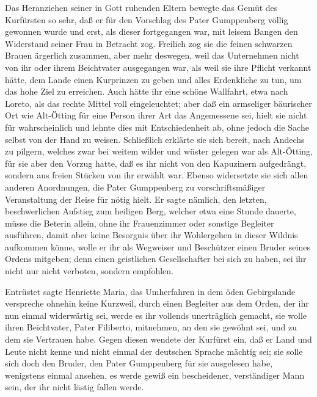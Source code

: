 Das Heranziehen seiner in Gott ruhenden Eltern bewegte das Gemüt
des Kurfürsten so sehr, daß er für den Vorschlag des Pater
Gumppenberg völlig gewonnen wurde und erst, als dieser fortgegangen
war, mit leisem Bangen den Widerstand seiner Frau in Betracht zog.
Freilich zog sie die feinen schwarzen Brauen ärgerlich zusammen,
aber mehr deswegen, weil das Unternehmen nicht von ihr oder ihrem
Beichtvater ausgegangen war, als weil sie ihre Pflicht verkannt
hätte, dem Lande einen Kurprinzen zu geben und alles Erdenkliche zu
tun, um das hohe Ziel zu erreichen. Auch hätte ihr eine schöne
Wallfahrt, etwa nach Loreto, als das rechte Mittel voll
eingeleuchtet; aber daß ein\pagenum{[106]} armseliger bäurischer
Ort wie Alt-Ötting für eine Person ihrer Art das Angemessene sei,
hielt sie nicht für wahrscheinlich und lehnte dies mit
Entschiedenheit ab, ohne jedoch die Sache selbst von der Hand zu
weisen. Schließlich erklärte sie sich bereit, nach Andechs zu
pilgern, welches zwar bei weitem wilder und wüster gelegen war als
Alt-Ötting, für sie aber den Vorzug hatte, daß es ihr nicht von den
Kapuzinern aufgedrängt, sondern aus freien Stücken von ihr erwählt
war. Ebenso widersetzte sie sich allen anderen Anordnungen, die
Pater Gumppenberg zu vorschriftsmäßiger Veranstaltung der Reise für
nötig hielt. Er sagte nämlich, den letzten, beschwerlichen Aufstieg
zum heiligen Berg, welcher etwa eine Stunde dauerte, müsse die
Beterin allein, ohne ihr Frauenzimmer oder sonstige Begleiter
ausführen, damit aber keine Besorgnis über ihr Wohlergehen in
dieser Wildnis aufkommen könne, wolle er ihr als Wegweiser und
Beschützer einen Bruder seines Ordens mitgeben; denn einen
geistlichen Gesellschafter bei sich zu haben, sei ihr nicht nur
nicht verboten, sondern empfohlen.

Entrüstet sagte Henriette Maria, das Umherfahren in dem öden
Gebirgslande verspreche ohnehin keine Kurzweil, durch einen
Begleiter aus dem Orden, der ihr nun einmal widerwärtig sei, werde
es ihr vollends unerträglich gemacht, sie wolle ihren Beichtvater,
Pater Filiberto, mitnehmen, an den sie gewöhnt sei, und zu dem sie
Vertrauen habe. Gegen diesen wendete der Kurfürst ein, daß er Land
und Leute nicht kenne und nicht einmal der deutschen Sprache
mächtig sei; sie solle sich doch den Bruder, den Pater Gumppenberg
für sie ausgelesen habe, wenigstens einmal ansehen, es werde gewiß
ein bescheidener, verständiger Mann sein, der ihr nicht lästig
fallen werde.

